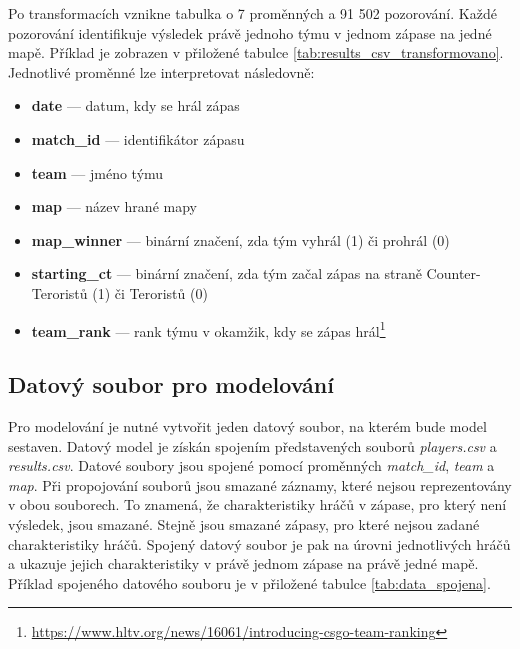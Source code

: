 Po transformacích vznikne tabulka o 7 proměnných a 91 502 pozorování. Každé pozorování identifikuje výsledek právě jednoho týmu v jednom zápase
na jedné mapě. Příklad je zobrazen v přiložené tabulce \ref{tab:results_csv_transformovano}. Jednotlivé proměnné lze interpretovat následovně:
\begin{itemize}
    \item \textbf{date} --- datum, kdy se hrál zápas
    \item \textbf{match\_id} --- identifikátor zápasu
    \item \textbf{team} --- jméno týmu
    \item \textbf{map} --- název hrané mapy
    \item \textbf{map\_winner} --- binární značení, zda tým vyhrál (1) či prohrál (0)
    \item \textbf{starting\_ct} --- binární značení, zda tým začal zápas na straně Counter-Teroristů (1) či Teroristů (0)
    \item \textbf{team\_rank} --- rank týmu v okamžik, kdy se zápas hrál\footnote{\url{https://www.hltv.org/news/16061/introducing-csgo-team-ranking}}
\end{itemize}

\subsection{Datový soubor pro modelování} \label{spojent_datovy_soubor}
Pro modelování je nutné vytvořit jeden datový soubor, na kterém bude model sestaven. Datový model je získán spojením představených souborů
\textit{players.csv} a \textit{results.csv}. Datové soubory jsou spojené pomocí proměnných \textit{match\_id}, \textit{team} a \textit{map}. Při propojování
souborů jsou smazané záznamy, které nejsou reprezentovány v obou souborech. To znamená, že charakteristiky hráčů v zápase, pro který není výsledek, jsou smazané.
Stejně jsou smazané zápasy, pro které nejsou zadané charakteristiky hráčů. Spojený datový soubor je pak na úrovni jednotlivých hráčů a ukazuje jejich charakteristiky
v právě jednom zápase na právě jedné mapě. Příklad spojeného datového souboru je v přiložené tabulce \ref{tab:data_spojena}.

